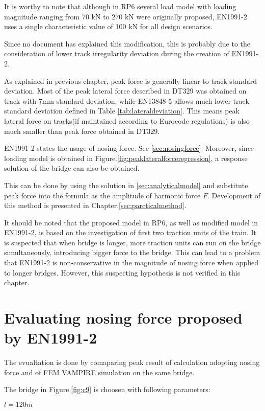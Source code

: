 It is worthy to note that although in RP6\citet[Proposed criteria]{d181} several load model with loading magnitude ranging from 70 kN to 270 kN were originally proposed, EN1991-2 uses a single characteristic value of 100 kN for all design scenarios. 


Since no document has explained this modification, this is probably due to the consideration of lower track irregularity deviation during the creation of EN1991-2.

As explained in previous chapter, peak force is generally linear to track standard deviation. Most of the peak lateral force described in DT329 was obtained on track with 7mm standard deviation, while EN13848-5\citet{13848} allows much lower track standard deviation defined in Table \ref{tab:lateraldeviation}. This means peak lateral force on tracks(if maintained according to Eurocode regulations) is also much smaller than peak force obtained in DT329. 

EN1991-2 states the usage of nosing force. See \ref{sec:nosingforce}. Moreover, since loading model is obtained in Figure.\ref{fig:peaklateralforceregression}, a response solution of the bridge can also be obtained. 

This can be done by using the solution in \ref{sec:analyticalmodel} and substitute peak force into the formula as the amplitude of harmonic force $F$. Development of this method is presented in Chapter.\ref{sec:parcticalmethod}. 
 
It should be noted that the proposed model in RP6, as well as modified model in EN1991-2, is based on the investigation of first two traction units of the train. It is suspected that when bridge is longer, more traction units can run on the bridge simultaneously, introducing bigger force to the bridge. This can lead to a problem that EN1991-2 is non-conservative in the magnitude of nosing force when applied to longer bridges. However, this suspecting hypothesis is not verified in this chapter.  

\section{Evaluating nosing force proposed by EN1991-2}
The evualtation is done by comaparing peak result of calculation adopting nosing force and of FEM VAMPIRE simulation on the same bridge.

The bridge in Figure.\ref{fig:c9} is choosen with following parameters:

$l = 120m$

